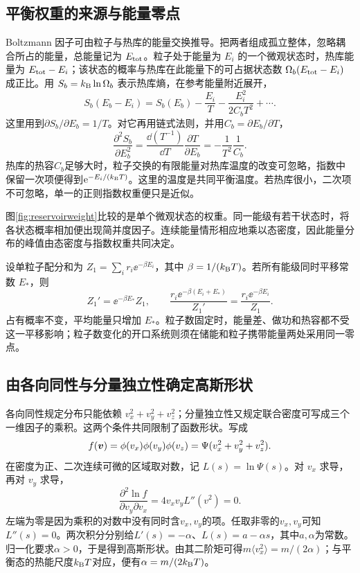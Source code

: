 \subsection{平衡权重的来源与能量零点}
\label{th:reservoirweight}
Boltzmann 因子可由粒子与热库的能量交换推导。把两者组成孤立整体，忽略耦合所占的能量，总能量记为 $E_{\rm tot}$。粒子处于能量为 $E_i$ 的一个微观状态时，热库能量为 $E_{\rm tot}-E_i$；该状态的概率与热库在此能量下的可占据状态数 $\Omega_b(E_{\rm tot}-E_i)$ 成正比。用 $S_b=k_{\mathrm B}\ln\Omega_b$ 表示热库熵，在参考能量附近展开，
\[
 S_b(E_b-E_i)=S_b(E_b)-\frac{E_i}{T}
 -\frac{E_i^2}{2C_bT^2}+\cdots.
\]
这里用到$\partial S_b/\partial E_b=1/T$。对它再用链式法则，并用$C_b=\partial E_b/\partial T$，
\[\frac{\partial^2S_b}{\partial E_b^2}
=\frac{\dd(T^{-1})}{\dd T}\frac{\partial T}{\partial E_b}
=-\frac1{T^2}\frac1{C_b}.\]
热库的热容$C_b$足够大时，粒子交换的有限能量对热库温度的改变可忽略，指数中保留一次项便得到$\mathrm e^{-E_i/(k_{\mathrm B} T)}$。这里的温度是共同平衡温度。若热库很小，二次项不可忽略，单一的正则指数权重便只是近似。

图\ref{fig:reservoirweight}比较的是单个微观状态的权重。同一能级有若干状态时，将各状态概率相加便出现简并度因子。连续能量情形相应地乘以态密度，因此能量分布的峰值由态密度与指数权重共同决定。

设单粒子配分和为 $Z_1=\sum_i r_i\ee^{-\beta E_i}$，其中 $\beta=1/(k_{\mathrm B} T)$。若所有能级同时平移常数 $E_\ast$，则
\[
 Z_1'= \ee^{-\beta E_\ast}Z_1,\qquad
 \frac{r_i\ee^{-\beta(E_i+E_\ast)}}{Z_1'}
 =\frac{r_i\ee^{-\beta E_i}}{Z_1}.
\]
占有概率不变，平均能量只增加 $E_\ast$。粒子数固定时，能量差、做功和热容都不受这一平移影响；粒子数变化的开口系统则须在储能和粒子携带能量两处采用同一零点。

\subsection{由各向同性与分量独立性确定高斯形状}
各向同性规定分布只能依赖 $v_x^2+v_y^2+v_z^2$；分量独立性又规定联合密度可写成三个一维因子的乘积。这两个条件共同限制了函数形状。写成
\[
 f(\bm{v})=\phi(v_x)\phi(v_y)\phi(v_z)
 =\Psi(v_x^2+v_y^2+v_z^2).
\]
在密度为正、二次连续可微的区域取对数，记 $L(s)=\ln\Psi(s)$。对 $v_x$ 求导，再对 $v_y$ 求导，
\[
 \frac{\partial^2\ln f}{\partial v_y\partial v_x}
 =4v_xv_yL''(v^2)=0.
\]
左端为零是因为乘积的对数中没有同时含$v_x,v_y$的项。任取非零的$v_x,v_y$可知$L''(s)=0$。两次积分分别给$L'(s)=-\alpha$、$L(s)=a-\alpha s$，其中$a,\alpha$为常数。归一化要求$\alpha>0$，于是得到高斯形状。由其二阶矩可得$m\langle v_x^2\rangle=m/(2\alpha)$；与平衡态的热能尺度$k_{\mathrm B} T$对应，便有$\alpha=m/(2k_{\mathrm B} T)$。

